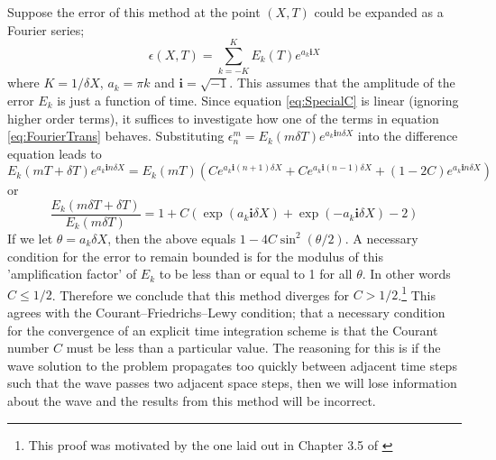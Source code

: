 \documentclass[10pt,a4paper,notitlepage]{article}
\begin{document}
Suppose the error of this method at the point $(X,T)$ could be expanded as a Fourier series;
\begin{equation}\label{eq:FourierTrans}
\epsilon\left(X,T\right)=\sum_{k=-K}^{K}E_{k}\left(T\right)e^{a_{k}\mathbf{i}X}
\end{equation}
where $K=1/\delta X$, $a_{k}=\pi k$ and $\mathbf{i}=\sqrt{-1}$. This assumes that the amplitude of the error $E_{k}$ is just a function of time. Since equation \eqref{eq:SpecialC} is linear (ignoring higher order terms), it suffices to investigate how one of the terms in equation \eqref{eq:FourierTrans} behaves. Substituting $\epsilon_{n}^{m}=E_{k}\left(m\delta T\right)e^{a_{k} \mathbf{i} n\delta X}$ into the difference equation leads to 
\begin{equation}
E_{k}\left(mT+\delta T\right)e^{a_{k}\mathbf{i}n\delta X} = E_{k}\left(mT\right)\left(Ce^{a_{k}\mathbf{i}(n+1)\delta X}+ Ce^{a_{k}\mathbf{i}(n-1)\delta X}+(1-2C)e^{a_{k}\mathbf{i}n\delta X}\right)
\end{equation}
or
\begin{equation}
\frac{E_{k}\left(m\delta T+\delta T\right)}{E_{k}\left(m\delta T\right)} = 1+C\left(\exp\left(a_{k}\mathbf{i}\delta X\right)+\exp\left(-a_{k}\mathbf{i} \delta X\right) -2\right)
\end{equation}
If we let $\theta = a_{k}\delta X$, then the above equals $1-4C\sin^{2}\left(\theta/2\right)$. A necessary condition for the error to remain bounded is for the modulus of this 'amplification factor' of $E_{k}$ to be less than or equal to 1 for all $\theta$.  In other words $C\leq 1/2$. Therefore we conclude that this method diverges for $C>1/2$.\footnote{This proof was motivated by the one laid out in Chapter 3.5 of \cite{trefethen1996finite}} This agrees with the Courant–Friedrichs–Lewy condition; that a necessary condition for the convergence of an explicit time integration scheme is that the Courant number $C$ must be less than a particular value. The reasoning for this is if the wave solution to the problem propagates too quickly between adjacent time steps such that the wave passes two adjacent space steps, then we will lose information about the wave and the results from this method will be incorrect.
\end{document}
